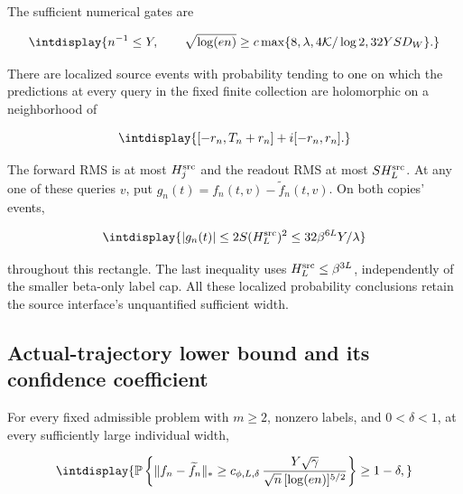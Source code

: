 The sufficient numerical gates are


\begingroup\renewcommand{\theHequation}{intdisplay.91}
\begin{equation*}
\intdisplay{
n^{-1}\le Y,\qquad
\sqrt{\log(en)}\ge c\max\{8,\lambda,4\mathcal K/\log2,32YSD_W\}.
}
\end{equation*}
\endgroup


There are localized source events with probability tending to one on which the predictions at every query in the fixed finite collection are holomorphic on a neighborhood of


\begingroup\renewcommand{\theHequation}{intdisplay.92}
\begin{equation*}
\intdisplay{
[-r_n,T_n+r_n]+i[-r_n,r_n].
}
\end{equation*}
\endgroup


The forward RMS is at most \(H_j^{\rm src}\) and the readout RMS at most \(SH_L^{\rm src}\). At any one of these queries \(v\), put \(g_n(t)=f_n(t,\allowbreak v)-\widetilde f_n(t,\allowbreak v)\). On both copies' events,


\begingroup\renewcommand{\theHequation}{intdisplay.93}
\begin{equation*}
\intdisplay{
|g_n(t)|\le2S(H_L^{\rm src})^2
\le32\beta^{6L}Y/\lambda
}
\end{equation*}
\endgroup


throughout this rectangle. The last inequality uses \(H_L^{\rm src}\le\beta^{3L}\), independently of the smaller beta-only label cap. All these localized probability conclusions retain the source interface's unquantified sufficient width.


\subsection{Actual-trajectory lower bound and its confidence coefficient}
\label{int:dense-trajectory-lower}


For every fixed admissible problem with \(m\ge2\), nonzero labels, and \(0<\delta<1\), at every sufficiently large individual width,


\begingroup\renewcommand{\theHequation}{intdisplay.94}
\begin{equation*}
\intdisplay{
\mathbb P\left\{\|f_n-\widetilde f_n\|_*
\ge c_{\phi,L,\delta}\,
\frac{Y\sqrt\gamma}{\sqrt n\,[\log(en)]^{5/2}}\right\}
\ge1-\delta,
}
\end{equation*}
\endgroup

